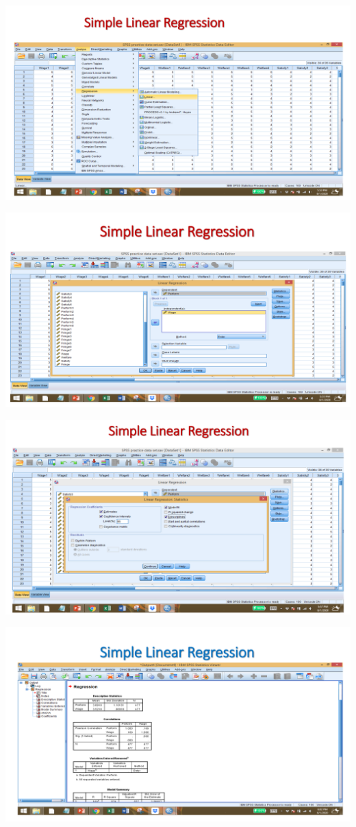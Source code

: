 \documentclass[
  letterpaper,
  DIV=11,
  numbers=noendperiod]{scrreprt}
\begin{document}
\includegraphics{images/slides/img_Page_139.png}

\includegraphics{images/slides/img_Page_140.png}

\includegraphics{images/slides/img_Page_141.png}

\includegraphics{images/slides/img_Page_142.png}
\end{document}
